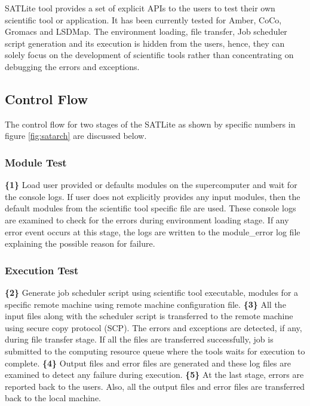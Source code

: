 \documentclass[10pt]{ruthesis}
\begin{document}
SATLite tool provides a set of explicit APIs to the users to test their own scientific tool or application. It has been currently tested for Amber, CoCo, Gromacs and LSDMap. The environment loading, file transfer, Job scheduler script generation and its execution is hidden from the users, hence, they can solely focus on the development of scientific tools rather than concentrating on debugging the errors and exceptions.

\subsection{Control Flow}
The control flow for two stages of the SATLite as shown by specific numbers in figure \ref{fig:satarch} are discussed below.

\subsubsection{Module Test}
\textbf{\{1\}} Load user provided or defaults modules on the supercomputer and wait for the console logs. If user does not explicitly provides any input modules, then the default modules from the scientific tool specific file are used. These console logs are examined to check for the errors during environment loading stage. If any error event occurs at this stage, the logs are written to the module\_error log file explaining the possible reason for failure.

\subsubsection{Execution Test}
\textbf{\{2\}} Generate job scheduler script using scientific tool executable, modules for a specific remote machine using remote machine configuration file. \newline
\textbf{\{3\}} All the input files along with the scheduler script is transferred to the remote machine using secure copy protocol (SCP). The errors and exceptions are detected, if any, during file transfer stage. If all the files are transferred successfully, job is submitted to the computing resource queue where the tools waits for execution to complete.\newline
\textbf{\{4\}} Output files and error files are generated and these log files are examined to detect any failure during execution.\newline
\textbf{\{5\}} At the last stage, errors are reported back to the users. Also, all the output files and error files are transferred back to the local machine. 
\end{document}
